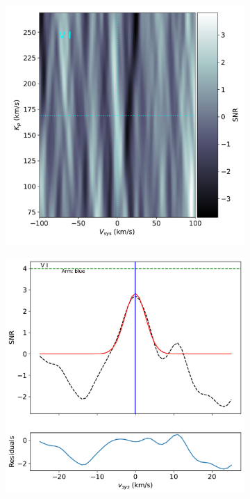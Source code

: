 \documentclass[twocolumn]{aastex631}
\begin{document}
\begin{figure}[ht!]
            \begin{subfigure}[b]{0.4\textwidth}
                \includegraphics[width=\textwidth]{plots-updated/kp-vsys-map/blue/KELT-20b.20190504.blue.V.CCFs-shifted.pdf}
                \caption{}\label{fig:2d-ccf-V-combined}
            \end{subfigure}
            \begin{subfigure}[b]{0.4\textwidth}
                \includegraphics[width=\textwidth]{plots-updated/line-profile/blue/KELT-20b.20190504.blue.V.SNR-Gaussian.pdf}
                \caption{}\label{fig:1d-ccf-V-combined}
            \end{subfigure}
        

\end{figure}
\end{document}

